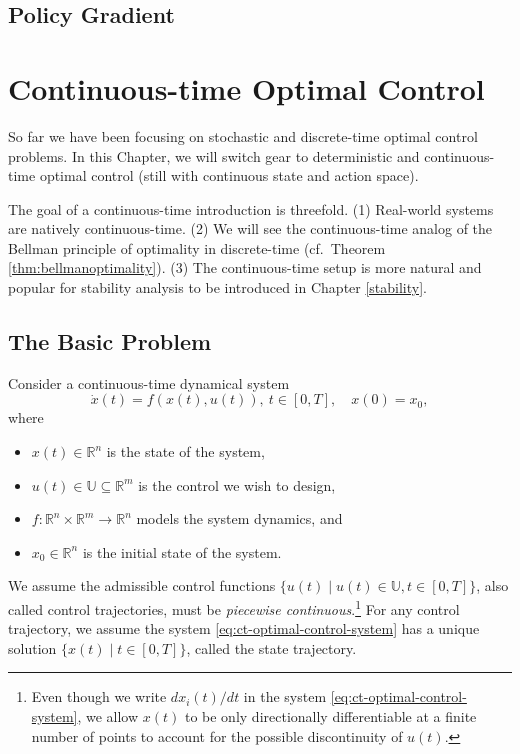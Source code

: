 \documentclass[
]{book}
\theoremstyle{definition}
\theoremstyle{definition}
\theoremstyle{definition}
\theoremstyle{definition}
\theoremstyle{remark}
\begin{document}
\hypertarget{policy-gradient}{%
\section{Policy Gradient}\label{policy-gradient}}

\hypertarget{continuous-time-optimal-control}{%
\chapter{Continuous-time Optimal Control}\label{continuous-time-optimal-control}}

So far we have been focusing on stochastic and discrete-time optimal control problems. In this Chapter, we will switch gear to deterministic and continuous-time optimal control (still with continuous state and action space).

The goal of a continuous-time introduction is threefold. (1) Real-world systems are natively continuous-time. (2) We will see the continuous-time analog of the Bellman principle of optimality in discrete-time (cf.~Theorem \ref{thm:bellmanoptimality}). (3) The continuous-time setup is more natural and popular for stability analysis to be introduced in Chapter \ref{stability}.

\hypertarget{the-basic-problem-1}{%
\section{The Basic Problem}\label{the-basic-problem-1}}

Consider a continuous-time dynamical system
\begin{equation}
\dot{x}(t) = f(x(t),u(t)),\ t \in [0,T], \quad x(0) = x_0,
\label{eq:ct-optimal-control-system}
\end{equation}
where

\begin{itemize}
\item
  \(x(t) \in \mathbb{R}^n\) is the state of the system,
\item
  \(u(t) \in \mathbb{U} \subseteq \mathbb{R}^m\) is the control we wish to design,
\item
  \(f: \mathbb{R}^{n} \times \mathbb{R}^m \rightarrow \mathbb{R}^n\) models the system dynamics, and
\item
  \(x_0 \in \mathbb{R}^n\) is the initial state of the system.
\end{itemize}

We assume the admissible control functions \(\{u(t) \mid u(t) \in \mathbb{U}, t\in [0,T] \}\), also called control trajectories, must be \emph{piecewise continuous}.\footnote{Even though we write \(dx_i(t)/dt\) in the system \eqref{eq:ct-optimal-control-system}, we allow \(x(t)\) to be only directionally differentiable at a finite number of points to account for the possible discontinuity of \(u(t)\).} For any control trajectory, we assume the system \eqref{eq:ct-optimal-control-system} has a unique solution \(\{x(t)\mid t \in [0,T] \}\), called the state trajectory.
\end{document}
